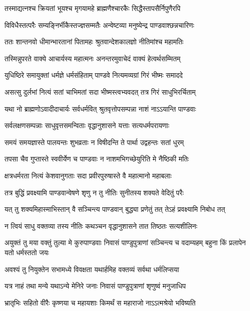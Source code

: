\twolineshloka
{तस्माद्यत्नश्च क्रियतां भूयश्च मृगयामहे}
{ब्राह्मणैश्चारकैः सिद्धैस्तापसैर्निपुणैरपि}


\twolineshloka
{विविधैस्तत्परैः सम्यङ्निर्भीकैस्तज्ज्ञसम्मतैः}
{अन्वेष्टव्या मनुष्येन्द्र पाण्डवाश्छन्नचारिणः}


\twolineshloka
{ततः शान्तनवो धीमान्भारतानां पितामहः}
{श्रुतवान्देशकालज्ञो नीतिमांश्च महामतिः}


\twolineshloka
{तस्मिन्नुपरते वाक्ये आचार्यस्य महात्मनः}
{अनन्तरमुवाचेदं वाक्यं हेत्वर्थसम्मितम्}


\twolineshloka
{युधिष्ठिरे समायुक्तां धर्मज्ञे धर्मसंहिताम्}
{पाण्डवे नित्यमव्यग्रां गिरं भीष्मः समाददे}


\twolineshloka
{असत्सु दुर्लभां नित्यं सतां चाभिमतां सदा}
{भीष्मस्त्वभ्यवदत् तत्र गिरं साधुभिरर्चिताम्}


\twolineshloka
{यथा नो ब्राह्मणोऽवादीदाचार्यः सर्वधर्मवित्}
{श्रुतवृत्तोपसम्पन्ना नाशं नाऽऽयान्ति पाण्डवाः}


\twolineshloka
{सर्वलक्षणसम्पन्नाः साधुवृत्तसमन्विताः}
{वृद्धानुशासने यत्ताः सत्यधर्मपरायणाः}


\twolineshloka
{समयं समयज्ञास्ते पालयन्तः शुभव्रताः}
{न विषीदन्ति ते पार्था उद्वहन्तः सतां धुरम्}


\twolineshloka
{तपसा चैव गुप्तास्ते स्ववीर्येण च पाण्डवाः}
{न नाशमभिगच्छेयुरिति मे नैष्ठिकी मतिः}


\twolineshloka
{क्षत्रधर्मरता नित्यं केशवानुगताः सदा}
{प्रवीरपुरुषास्ते वै महात्मानो महाबलाः}


\twolineshloka
{तत्र बुद्धिं प्रवक्ष्यामि पाण्डवान्वेषणे शृणु}
{न तु नीतिः सुनीतस्य शक्यते वेदितुं परैः}


\twolineshloka
{यत् तु शक्यमिहास्माभिस्तान् वै सञ्चिन्त्य पाण्डवान्}
{बुद्ध्या प्रणेतुं तत् तेऽहं प्रवक्ष्यामि निबोध तत्}


\twolineshloka
{न त्वियं साधु वक्तव्या तस्य नीतिः कथञ्चन}
{वृद्धानुशासने तात तिष्ठतः सत्यशीलिनः}


\threelineshloka
{अयुक्तं तु मया वक्तुं तुल्या मे कुरुपाण्डवाः}
{निवासं पाण्डुपुत्राणां सञ्चिन्त्य च वदाम्यहम्}
{बहुना किं प्रलापेन यतो धर्मस्ततो जयः}


\twolineshloka
{अवश्यं तु नियुक्तेन सभामध्ये विवक्षता}
{यथार्हमिह वक्तव्यं सर्वथा धर्मलिप्सया}


\twolineshloka
{यत्र नाहं तथा मन्ये यथाऽन्ये मेनिरे जनाः}
{निवासं पाण्डुपुत्राणां शृणुष्वं मनुजाधिप}


\twolineshloka
{भ्रातृभिः सहितो वीरैः कृष्णया च महायशाः}
{किमर्थं स महाराजो नाऽऽत्मश्रेयो भविष्यति}


